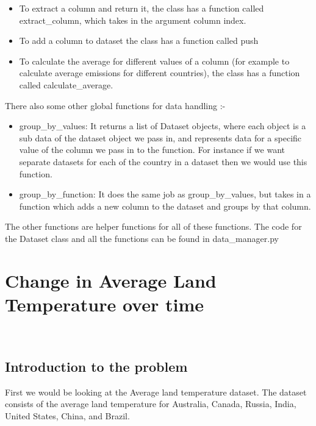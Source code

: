 \documentclass[a4paper, 11pt]{report}
\begin{document}
\begin{itemize}
    \item To extract a column and return it, the class has a function called extract\_column, which takes in the argument column index.\\

    \item To add a column to dataset the class has a function called push\\

    \item To calculate the average for different values of a column (for example to calculate average emissions for different countries), the class has a function called calculate\_average. \\

\end{itemize}

   There also some other global functions for data handling :-

   \begin{itemize}
       \item group\_by\_values: It returns a list of Dataset objects, where each object is a sub data of the dataset object we pass in, and represents data for a specific value of the column we pass in to the function. For instance if we want separate datasets for each of the country in a dataset then we would use this function.  \\

       \item group\_by\_function: It does the same job as group\_by\_values, but takes in a function which adds a new column to the dataset and groups by that column. \\

   \end{itemize}

   The other functions are helper functions for all of these functions. The code for the Dataset class and all the functions can be found in data\_manager.py

\newpage

\section{Change in Average Land Temperature over time}
~\\
\subsection{Introduction to the problem}
First we would be looking at the Average land temperature dataset. The dataset consists of the average land temperature for Australia, Canada, Russia, India, United States, China, and Brazil. \\
\end{document}
